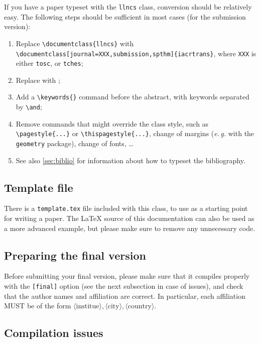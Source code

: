 \documentclass{iacrcc}
\begin{document}
If you have a paper typeset with the \texttt{llncs} class, conversion
should be relatively easy.  The following steps should be sufficient
in most cases (for the submission version):
\begin{enumerate}
\item Replace \verb+\documentclass{llncs}+ with\\
    \verb+\documentclass[journal=XXX,submission,spthm]{iacrtrans}+,
    where \verb+XXX+ is either \verb+tosc+, or \verb+tches+;
\item Replace \verb++ with
  \verb++;
\item Add a \verb+\keywords{}+ command before the abstract, with
  keywords separated by \verb+\and+;
\item Remove commands that might override the class style, such as
  \verb+\pagestyle{...}+ or \verb+\thispagestyle{...}+,
  change of margins (\emph{e.\,g.}  with the \texttt{geometry} package),
  change of fonts, \ldots
\item See also \autoref{sec:biblio} for information about how to
  typeset the bibliography.
\end{enumerate}
\fi

\subsection{Template file}

There is a \texttt{template.tex} file included with this class, to use
as a starting point for writing a paper.  The \LaTeX{} source of this
documentation can also be used as a more advanced example, but please
make sure to remove any unnecessary code.

\subsection{Preparing the final version}

Before submitting your final version, please make sure that it compiles
properly with the \texttt{[final]} option (see the next subsection in
case of issues), and check that the author names and affiliation are
correct.  In particular, each affiliation MUST be of the form
$\langle\text{institue}\rangle, \langle\text{city}\rangle,
\langle\text{country}\rangle$.

\subsection{Compilation issues}
\end{document}
